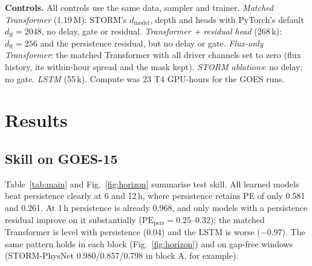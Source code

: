 \documentclass[conference,a4paper]{IEEEtran}
\begin{document}
\textbf{Controls.} All controls use the same data, sampler and trainer.
\emph{Matched Transformer} (1.19\,M): STORM's \(d_{\mathrm{model}}\), depth and
heads with PyTorch's default \(d_{\mathrm{ff}}=2048\), no delay, gate or residual.
\emph{Transformer + residual head} (268\,k): \(d_{\mathrm{ff}}=256\) and the
persistence residual, but no delay or gate. \emph{Flux-only Transformer}: the
matched Transformer with all driver channels set to zero (flux history, its
within-hour spread and the mask kept). \emph{STORM ablations}:
no delay; no gate. \emph{LSTM} (55\,k). Compute was 23 T4 GPU-hours for the GOES runs.

\section{Results}
\label{sec:results}
\subsection{Skill on GOES-15}
Table~\ref{tab:main} and Fig.~\ref{fig:horizon} summarise test skill. All
learned models beat persistence clearly at 6 and 12\,h, where persistence
retains PE of only 0.581 and 0.261. At 1\,h persistence is already 0.968, and
only models with a persistence residual improve on it substantially
(\(\mathrm{PE}_{\mathrm{pers}}=0.25\)--0.32); the matched Transformer is level
with persistence (0.04) and the LSTM is worse (\(-0.97\)). The same pattern holds in each block (Fig.~\ref{fig:horizon}) and on gap-free
windows (STORM-PhysNet 0.980/0.857/0.798 in block A, for example).
\end{document}
